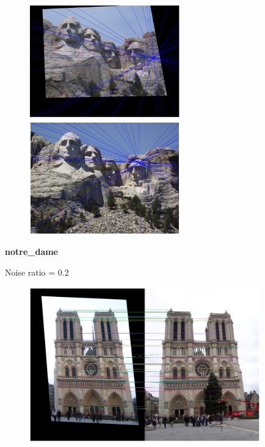\documentclass[11pt]{article}
\begin{document}
\begin{figure}[H]
    \centering
    \includegraphics[width=6.5cm]{images/part3/ransac_image_1_noise_0.4_left.png}
    \includegraphics[width=6.5cm]{images/part3/ransac_image_1_noise_0.4_right.png}
\end{figure}

\textbf{notre\_dame}

Noise ratio = 0.2
\begin{figure}[H]
    \centering
    \includegraphics[width=10cm]{images/part3/ransac_image_2_noise_0.2_1.png}
\end{figure}
\end{document}
